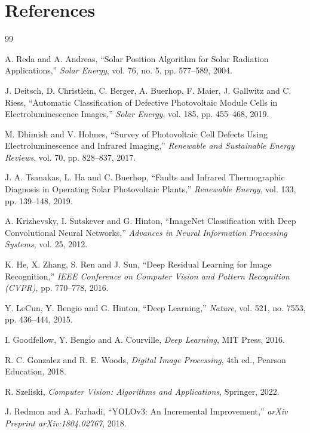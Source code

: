 \chapter{References}

\begin{thebibliography}{99}

A. Reda and A. Andreas,
``Solar Position Algorithm for Solar Radiation Applications,''
\textit{Solar Energy}, vol. 76, no. 5, pp. 577--589, 2004.

J. Deitsch, D. Christlein, C. Berger, A. Buerhop, F. Maier, J. Gallwitz and C. Riess,
``Automatic Classification of Defective Photovoltaic Module Cells in Electroluminescence Images,''
\textit{Solar Energy}, vol. 185, pp. 455--468, 2019.

M. Dhimish and V. Holmes,
``Survey of Photovoltaic Cell Defects Using Electroluminescence and Infrared Imaging,''
\textit{Renewable and Sustainable Energy Reviews}, vol. 70, pp. 828--837, 2017.

J. A. Tsanakas, L. Ha and C. Buerhop,
``Faults and Infrared Thermographic Diagnosis in Operating Solar Photovoltaic Plants,''
\textit{Renewable Energy}, vol. 133, pp. 139--148, 2019.

A. Krizhevsky, I. Sutskever and G. Hinton,
``ImageNet Classification with Deep Convolutional Neural Networks,''
\textit{Advances in Neural Information Processing Systems}, vol. 25, 2012.

K. He, X. Zhang, S. Ren and J. Sun,
``Deep Residual Learning for Image Recognition,''
\textit{IEEE Conference on Computer Vision and Pattern Recognition (CVPR)}, pp. 770--778, 2016.

Y. LeCun, Y. Bengio and G. Hinton,
``Deep Learning,''
\textit{Nature}, vol. 521, no. 7553, pp. 436--444, 2015.

I. Goodfellow, Y. Bengio and A. Courville,
\textit{Deep Learning},
MIT Press, 2016.

R. C. Gonzalez and R. E. Woods,
\textit{Digital Image Processing},
4th ed., Pearson Education, 2018.

R. Szeliski,
\textit{Computer Vision: Algorithms and Applications},
Springer, 2022.

J. Redmon and A. Farhadi,
``YOLOv3: An Incremental Improvement,''
\textit{arXiv Preprint arXiv:1804.02767}, 2018.


\end{thebibliography}

